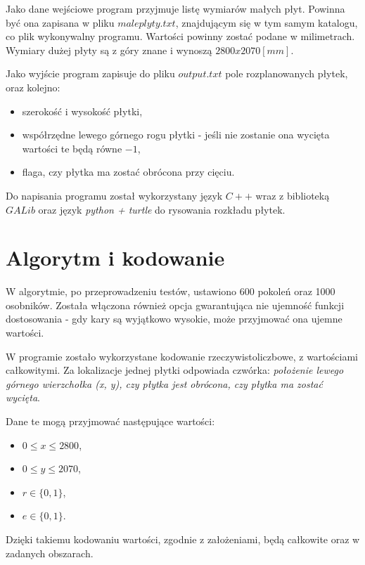 \documentclass[11pt]{article}
\begin{document}
Jako dane wejściowe program przyjmuje listę wymiarów małych płyt. Powinna być ona zapisana w pliku $maleplyty.txt$, znajdującym się w tym samym katalogu, co plik wykonywalny programu. Wartości powinny zostać podane w milimetrach. Wymiary dużej płyty są z góry znane i wynoszą $2800x2070 [mm]$.

Jako wyjście program zapisuje do pliku $output.txt$ pole rozplanowanych płytek, oraz kolejno:
\begin{itemize}
\item szerokość i wysokość płytki,
\item współrzędne lewego górnego rogu płytki - jeśli nie zostanie ona wycięta wartości te będą równe $-1$,
\item flaga, czy płytka ma zostać obrócona przy cięciu.
\end{itemize}

Do napisania programu został wykorzystany język $C++$ wraz z biblioteką $GALib$ oraz język \textit{python + turtle} do rysowania rozkładu płytek.

\section{Algorytm i kodowanie}
W algorytmie, po przeprowadzeniu testów, ustawiono 600 pokoleń oraz 1000 osobników. Została włączona również opcja gwarantująca nie ujemność funkcji dostosowania - gdy kary są wyjątkowo wysokie, może przyjmować ona ujemne wartości.

W programie zostało wykorzystane kodowanie rzeczywistoliczbowe, z wartościami całkowitymi. Za lokalizacje jednej płytki odpowiada czwórka: \textit{położenie lewego górnego wierzchołka (x, y), czy płytka jest obrócona, czy płytka ma zostać wycięta}.

Dane te mogą przyjmować następujące wartości:
\begin{itemize}
\item $ 0 \leq x \leq 2800$,
\item $ 0 \leq y \leq 2070$,
\item $ r \in \{0, 1\} $,
\item $ e \in \{0, 1\}$.
\end{itemize}

Dzięki takiemu kodowaniu wartości, zgodnie z założeniami, będą całkowite oraz w zadanych obszarach.
\end{document}
